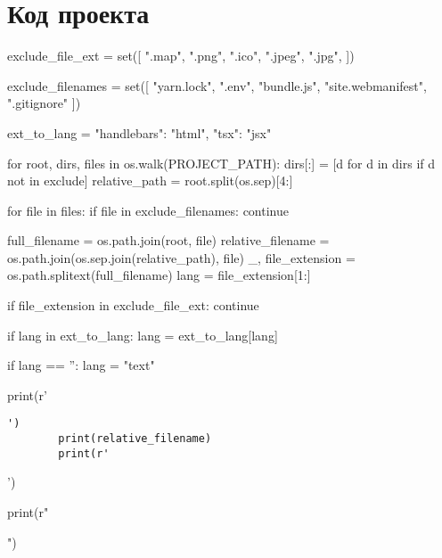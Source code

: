 \section{Код проекта}
\begin{pycode}
exclude_file_ext = set([
    ".map",
    ".png",
    ".ico",
    ".jpeg",
    ".jpg",
])

exclude_filenames = set([
    "yarn.lock",
    ".env",
    "bundle.js",
    "site.webmanifest",
    ".gitignore"
])

ext_to_lang = {
    "handlebars": "html",
    "tsx": "jsx"
}

for root, dirs, files in os.walk(PROJECT_PATH):
    dirs[:] = [d for d in dirs if d not in exclude]
    relative_path = root.split(os.sep)[4:]

    for file in files:
        if file in exclude_filenames:
                continue

        full_filename = os.path.join(root, file)
        relative_filename = os.path.join(os.sep.join(relative_path), file)
        _, file_extension = os.path.splitext(full_filename)
        lang = file_extension[1:]

        if file_extension in exclude_file_ext:
            continue

        if lang in ext_to_lang:
            lang = ext_to_lang[lang]

        if lang == '':
            lang = "text"

        print(r'\begin{verbatim}')
        print(relative_filename)
        print(r'\end{verbatim}')

        print(r"")
\end{pycode}

\clearpage